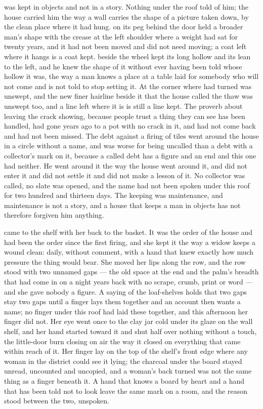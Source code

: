  was kept in objects and not in a story. Nothing under the roof told of him; the house carried him the way a wall carries the shape of a picture taken down, by the clean place where it had hung.  on its peg behind the door held a broader man's shape with the crease at the left shoulder where a weight had sat for twenty years, and it had not been moved and did not need moving; a coat left where it hangs is a coat kept.  beside the wheel kept its long hollow and its lean to the left, and he knew the shape of it without ever having been told whose hollow it was, the way a man knows a place at a table laid for somebody who will not come and is not told to stop setting it. At the corner  where  had turned was unswept, and the new finer hairline beside it that the house called the thaw was unswept too, and a line left where it is is still a line kept. The proverb about leaving the crack showing, because people trust a thing they can see has been handled, had gone years ago to a pot with no crack in it, and had not come back and had not been missed. The debt against a firing of tiles went around the house in a circle without a name, and was worse for being uncalled than a debt with a collector's mark on it, because a called debt has a figure and an end and this one had neither. He went around it the way the house went around it, and did not enter it and did not settle it and did not make a lesson of it. No collector was called, no slate was opened, and the name had not been spoken under this roof for two hundred and thirteen days. The keeping was maintenance, and maintenance is not a story, and a house that keeps a man in objects has not therefore forgiven him anything.

\scenebreak

 came to the shelf with her back to the basket. It was the order of the house and had been the order since the first firing, and she kept it the way a widow keeps a wound clean: daily, without comment, with a hand that knew exactly how much pressure the thing would bear. She moved her lips along the row, and the row stood with two unnamed gaps --- the old space at the end and the palm's breadth that had come in on a night years back with no scrape, crumb, print or word --- and she gave nobody a figure. A saying of the loaf-shelves holds that two gaps stay two gaps until a finger lays them together and an account then wants a name; no finger under this roof had laid these together, and this afternoon her finger did not. Her eye went once to the clay jar cold under its glaze on the wall shelf, and her hand started toward it and shut half over nothing without a touch, the little-door burn closing on air the way it closed on everything that came within reach of it. Her finger lay on the top of the shelf's front edge where any woman in the district could see it lying; the charcoal under the board stayed unread, uncounted and uncopied, and a woman's back turned was not the same thing as a finger beneath it. A hand that knows a board by heart and a hand that has been told not to look leave the same mark on a room, and the reason stood between the two, unspoken.

